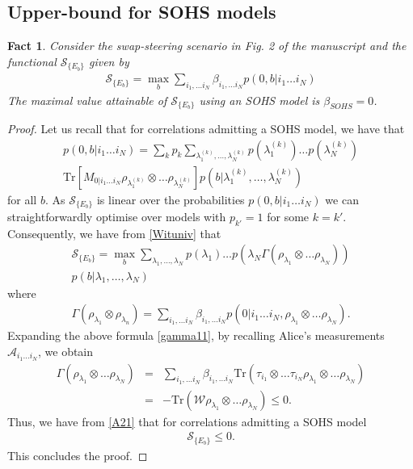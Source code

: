 \documentclass[pra,twocolumn,showpacs]{revtex4-2}
\newcommand{\Tr}[1]{\mathrm{Tr}#1}
\newcommand{\p}{\Vec{p}}
\theoremstyle{plain}
\newtheorem{fakt}{Fact}
\theoremstyle{definition}
\theoremstyle{remark}
\begin{document}
\subsection{Upper-bound for SOHS models}
\setcounter{fakt}{1}
\begin{fakt}
    Consider the swap-steering scenario in Fig. 2 of the manuscript and the functional $\mathcal{S}_{\{E_b\}}$ given by 
    \begin{eqnarray}\label{Wituniv}
    \mathcal{S}_{\{E_b\}}=\max_{b}\sum_{i_1,\ldots i_N}\beta_{i_1,\ldots i_N}p(0,b|i_1\ldots i_N)
\end{eqnarray}
    The maximal value attainable of $\mathcal{S}_{\{E_b\}}$ using an SOHS model is $\beta_{SOHS}=0$. 
\end{fakt}
\begin{proof}
    Let us recall that for correlations admitting a SOHS model, we have that
    \begin{eqnarray}
        p(0,b|i_1\ldots i_N)= \sum_{k}{p_k}\sum_{\lambda_1^{(k)},\ldots,\lambda_N^{(k)}}p(\lambda_1^{(k)})\ldots p(\lambda_N^{(k)})\nonumber\\ \Tr{[M_{0|i_1\ldots i_N}\rho_{\lambda_1^{(k)}}\otimes\ldots\rho_{\lambda_N^{(k)}}]} p(b|\lambda_1^{(k)},\ldots,\lambda_N^{(k)})
    \end{eqnarray}
for all $b$. As $\mathcal{S}_{\{E_b\}}$ is linear over the probabilities $p(0,b|i_1\ldots i_N)$ we can straightforwardly optimise over models with $p_{k'}=1$ for some $k=k'$. Consequently, we have from \eqref{Wituniv} that
\begin{eqnarray}\label{A21}
    \mathcal{S}_{\{E_b\}}=\max_b\sum_{\lambda_1,\ldots,\lambda_N}p(\lambda_1)\ldots p(\lambda_N \Gamma(\rho_{\lambda_1}\otimes\ldots\rho_{\lambda_N}) )\nonumber\\p(b|\lambda_1,\ldots,\lambda_N)\quad
\end{eqnarray}
where 
\begin{eqnarray}\label{gamma11}
    \Gamma(\rho_{\lambda_1}\otimes\rho_{\lambda_n})=\sum_{i_1,\ldots i_N}\beta_{i_1,\ldots i_N}p(0|i_1\ldots i_N,\rho_{\lambda_1}\otimes\ldots\rho_{\lambda_N}).
\end{eqnarray}
Expanding the above formula \eqref{gamma11}, by recalling Alice's measurements $\mathcal{A}_{i_1\ldots i_N}$, we obtain
\begin{eqnarray}
    \Gamma(\rho_{\lambda_1}\otimes\ldots\rho_{\lambda_N})&=& \sum_{i_1,\ldots i_N}\beta_{i_1,\ldots i_N}\Tr(\tau_{i_1}\otimes\ldots\tau_{i_N} \rho_{\lambda_1}\otimes\ldots\rho_{\lambda_N}) \nonumber\\&=&-\Tr(\mathcal{W}\rho_{\lambda_1}\otimes\ldots\rho_{\lambda_N})\leq 0.
\end{eqnarray}
Thus, we have from \eqref{A21} that for correlations admitting a SOHS model
\begin{eqnarray}
    \mathcal{S}_{\{E_b\}}\leq0.
\end{eqnarray}
This concludes the proof.
\end{proof}
\end{document}
